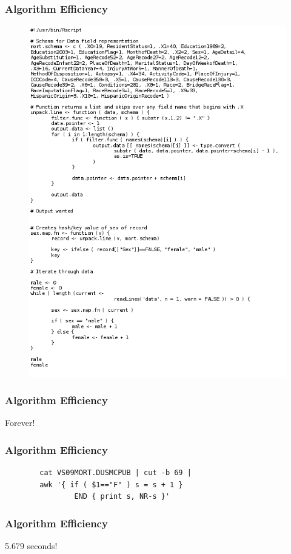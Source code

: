 
\begin{frame}
		\frametitle{Algorithm Efficiency}
		\begin{figure}
		\includegraphics[width=0.5\linewidth]{figures/diagrams/tabular/tabularRcode}
		\end{figure}
\end{frame}

\begin{frame}
		\frametitle{Algorithm Efficiency}
		\Huge{\centerline{Forever!}}
\end{frame}

\begin{frame}[fragile]
		\frametitle{Algorithm Efficiency}
		\begin{verbatim}
		cat VS09MORT.DUSMCPUB | cut -b 69 | 
		awk '{ if ( $1=="F" ) s = s + 1 } 
		        END { print s, NR-s }'
		\end{verbatim}
\end{frame}

\begin{frame}
		\frametitle{Algorithm Efficiency}
		\Huge{\centerline{5.679 seconds!}}
\end{frame}
